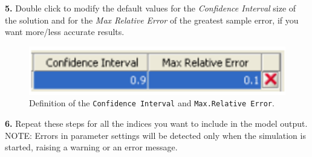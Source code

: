 \textbf{5.} Double click to modify the default values for the
\emph{Confidence Interval} size of the solution and for the
\emph{Max Relative Error} of the greatest sample error, if you
want more/less accurate results.\\
\begin{figure}[!]
    \begin{center}
        \includegraphics[scale=.5]{img/jsimg/5.5.eps}
    \end{center}
    \caption{Definition of the \texttt{Confidence Interval} and
    \texttt{Max.Relative Error}.}
    \label{fig:ConfIntMaxerr}
\end{figure}
\textbf{6.} Repeat these steps for all the indices you want to
include in
the model output.\\

NOTE: Errors in parameter settings will be detected only when the
simulation is started, raising a warning or an error message.

